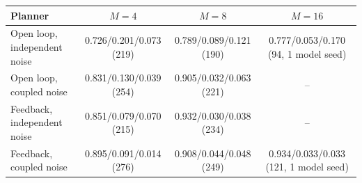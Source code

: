 \begin{tabular}{lccc}
\toprule
Planner & $M=4$ & $M=8$ & $M=16$ \\
\midrule
Open loop, independent noise & 0.726/0.201/0.073 (219) & 0.789/0.089/0.121 (190) & 0.777/0.053/0.170 (94, 1 model seed) \\
Open loop, coupled noise & 0.831/0.130/0.039 (254) & 0.905/0.032/0.063 (221) & -- \\
Feedback, independent noise & 0.851/0.079/0.070 (215) & 0.932/0.030/0.038 (234) & -- \\
Feedback, coupled noise & 0.895/0.091/0.014 (276) & 0.908/0.044/0.048 (249) & 0.934/0.033/0.033 (121, 1 model seed) \\
\bottomrule
\end{tabular}
